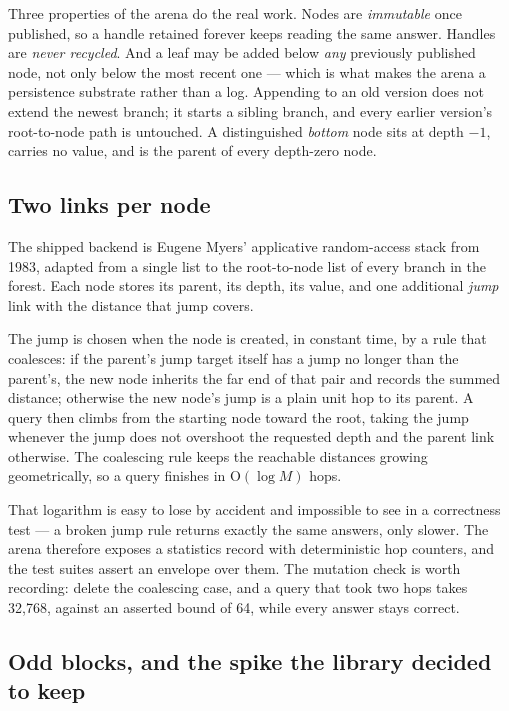 \documentclass[11pt,twoside,openright]{book}
\newcommand{\term}[1]{\textit{#1}}
\newcommand{\bigoh}[1]{$\mathrm{O}(#1)$}
\begin{document}
\noindent
Three properties of the arena do the real work. Nodes are \emph{immutable} once
published, so a handle retained forever keeps reading the same answer. Handles
are \emph{never recycled}. And a leaf may be added below \emph{any} previously
published node, not only below the most recent one --- which is what makes the
arena a persistence substrate rather than a log. Appending to an old version
does not extend the newest branch; it starts a sibling branch, and every earlier
version's root-to-node path is untouched. A distinguished \term{bottom} node
sits at depth $-1$, carries no value, and is the parent of every depth-zero
node.

\subsection{Two links per node}

The shipped backend is Eugene Myers' applicative random-access stack from 1983,
adapted from a single list to the root-to-node list of every branch in the
forest. Each node
stores its parent, its depth, its value, and one additional \term{jump} link
with the distance that jump covers.

The jump is chosen when the node is created, in constant time, by a rule that
coalesces: if the parent's jump target itself has a jump no
longer than the parent's, the new node inherits the far end of that pair and
records the summed distance; otherwise the new node's jump is a plain unit hop
to its parent. A query then climbs from the starting node toward the root,
taking the jump whenever the jump does not overshoot the requested depth and the
parent link otherwise. The coalescing rule keeps the reachable distances
growing geometrically, so a query finishes in \bigoh{\log M} hops.

That logarithm is easy to lose by accident and impossible to see in a
correctness test --- a broken jump rule returns exactly the same answers, only
slower. The arena therefore exposes a statistics record with deterministic hop
counters, and the test suites assert an envelope over them. The mutation check
is worth recording: delete the coalescing case, and a query that took two hops
takes 32{,}768, against an asserted bound of 64, while every answer stays
correct.

\subsection{Odd blocks, and the spike the library decided to keep}
\end{document}
